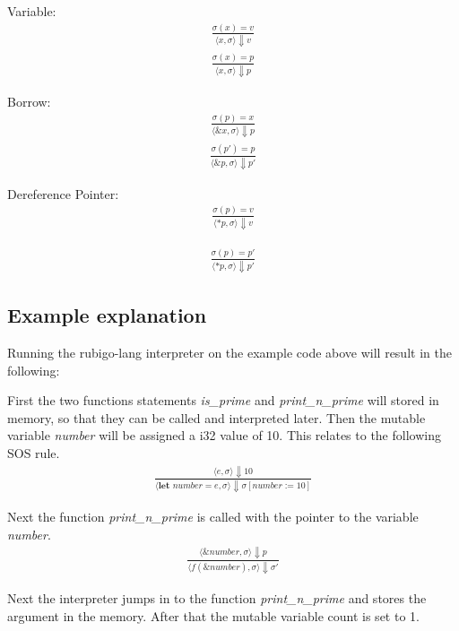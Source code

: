\documentclass[12pt]{article}
\begin{document}
	Variable:
	\begin{align*}
		\frac{\sigma(x) = v}
		{\langle x, \sigma \rangle\Downarrow v}
	\end{align*}
	\begin{align*}
		\frac{\sigma(x) = p}
		{\langle x, \sigma \rangle\Downarrow p}
	\end{align*}

	Borrow:
	\begin{align*}
		\frac{\sigma(p) = x}
		{\langle \&x, \sigma \rangle\Downarrow p}
	\end{align*}
	\begin{align*}
		\frac{\sigma(p') = p}
		{\langle \&p, \sigma \rangle\Downarrow p'}
	\end{align*}

	Dereference Pointer:
	\begin{align*}
		\frac{\sigma(p) = v}
		{\langle *p, \sigma \rangle\Downarrow v}
	\end{align*}

	\begin{align*}
		\frac{\sigma(p) = p'}
		{\langle *p, \sigma \rangle\Downarrow p'}
	\end{align*}	


    \subsection{Example explanation}
	Running the rubigo-lang interpreter on the example code above will result in the following:

	First the two functions statements \emph{is\_prime} and \emph{print\_n\_prime} will stored in memory, so that they can be called and interpreted later. Then the mutable variable \emph{number} will be assigned a i32 value of 10. This relates to the following SOS rule.
	\begin{align*}
		\frac{\langle e, \sigma \rangle\Downarrow 10}
		{\langle  \textbf{let } number = e, \sigma \rangle\Downarrow \sigma [number := 10]}
	\end{align*}

	Next the function \emph{print\_n\_prime} is called with the pointer to the variable \emph{number}.
	\begin{align*}
		\frac{\langle \&number, \sigma \rangle\Downarrow p}
		{\langle f(\&number), \sigma \rangle\Downarrow \sigma'}
	\end{align*}

	Next the interpreter jumps in to the function \emph{print\_n\_prime} and stores the argument in the memory. After that the mutable variable count is set to 1.
\end{document}
